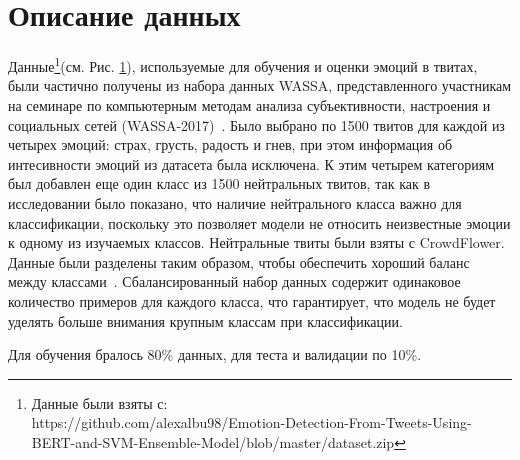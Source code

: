 \documentclass{article}
\begin{document}
\section{Описание данных}
Данные\footnote{Данные были взяты с: \\ https://github.com/alexalbu98/Emotion-Detection-From-Tweets-Using-BERT-and-SVM-Ensemble-Model/blob/master/dataset.zip}(см. Рис. \ref{eq:distr_emot}), используемые для обучения и оценки эмоций в твитах, были частично получены из набора данных WASSA, представленного участникам на семинаре по компьютерным методам анализа субъективности, настроения и социальных сетей (WASSA-2017)~\cite{wassa}. Было выбрано по 1500 твитов для каждой из четырех эмоций: страх, грусть, радость и гнев, при этом информация об интесивности эмоций из датасета была исключена. К этим четырем категориям был добавлен еще один класс из 1500 нейтральных твитов, так как в исследовании\cite{koppel} было показано, что наличие нейтрального класса важно для классификации, поскольку это позволяет модели не относить неизвестные эмоции к одному из изучаемых классов. Нейтральные твиты были взяты с CrowdFlower. 
Данные были разделены таким образом, чтобы обеспечить хороший баланс между классами~\cite{borovicka}. Сбалансированный набор данных содержит одинаковое количество примеров для каждого класса, что гарантирует, что модель не будет уделять больше внимания крупным классам при классификации.

Для обучения бралось 80\% данных, для теста и валидации по 10\%.
\begin{figure}[h]
	\caption{\centering}
	\label{eq:distr_emot}
\end{figure}
\end{document}
